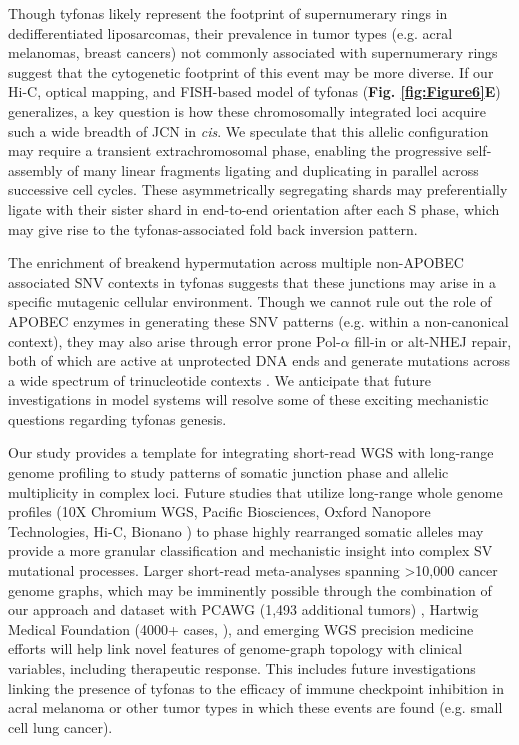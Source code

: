\documentclass[phd,tocprelim]{cornell}
\begin{document}
Though tyfonas likely represent the footprint of supernumerary rings in dedifferentiated liposarcomas, their prevalence in tumor types (e.g. acral melanomas, breast cancers) not commonly associated with supernumerary rings suggest that the cytogenetic footprint of this event may be more diverse. If our Hi-C, optical mapping, and FISH-based model of tyfonas (\textbf{Fig. \ref{fig:Figure6}E}) generalizes, a key question is how these chromosomally integrated loci acquire such a wide breadth of JCN in \textit{cis}. We speculate that this allelic configuration may require a transient extrachromosomal phase, enabling the progressive self-assembly of many linear fragments ligating and duplicating in parallel across successive cell cycles.  These asymmetrically segregating shards may preferentially ligate with their sister shard in end-to-end orientation after each S phase, which may give rise to the tyfonas-associated fold back inversion pattern.

The enrichment of breakend hypermutation across multiple non-APOBEC associated SNV contexts in tyfonas suggests that these junctions may arise in a specific mutagenic cellular environment.  Though we cannot rule out the role of APOBEC enzymes in generating these SNV patterns (e.g. within a non-canonical context), they may also arise through error prone Pol-$\alpha$ fill-in or alt-NHEJ repair, both of which are active at unprotected DNA ends and generate mutations across a wide spectrum of trinucleotide contexts \cite{sfeir2012,Mirman:2018jm}.  We anticipate that future investigations in model systems will resolve some of these exciting mechanistic questions regarding tyfonas genesis.

Our study provides a template for integrating short-read WGS with long-range genome profiling to study patterns of somatic junction phase and allelic multiplicity in complex loci. Future studies that utilize long-range whole genome profiles (10X Chromium WGS, Pacific Biosciences, Oxford Nanopore Technologies, Hi-C, Bionano \mbox{\cite{Sedlazeck2018-ix}}) to phase highly rearranged somatic alleles may provide a more granular classification and mechanistic insight into complex SV mutational processes.  Larger short-read meta-analyses spanning >10,000 cancer genome graphs, which may be imminently possible through the combination of our approach and dataset with PCAWG (1,493 additional tumors) \cite{pcawg_marker2020-yi}, Hartwig Medical Foundation (4000+ cases, \cite{Priestley:20196a6}), and emerging WGS precision medicine efforts will help link novel features of genome-graph topology with clinical variables, including therapeutic response. This includes future investigations linking the presence of tyfonas to the efficacy of immune checkpoint inhibition in acral melanoma or other tumor types in which these events are found (e.g. small cell lung cancer).
\end{document}
